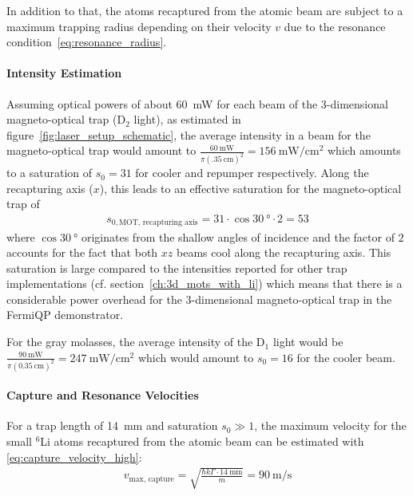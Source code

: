 In addition to that, the atoms recaptured from the atomic beam are subject to a maximum trapping radius depending on their velocity $v$ due to the resonance condition~\eqref{eq:resonance_radius}.

\paragraph{Intensity Estimation}
Assuming optical powers of about \SI{60}{\milli\watt} for each beam of the 3-dimensional magneto-optical trap (D$_2$ light), as estimated in figure~\ref{fig:laser_setup_schematic}, the average intensity in a beam for the magneto-optical trap would amount to $\frac{\SI{60}{\milli\watt}}{\pi (\SI{.35}{\centi\meter})^2} = \SI{156}{\milli\watt\per\centi\meter\squared}$ which amounts to a saturation of $s_0 = 31$ for cooler and repumper respectively. Along the recapturing axis ($x$), this leads to an effective saturation for the magneto-optical trap of
\begin{align}
    s_{0, \text{MOT, recapturing axis}} = 31 \cdot \cos \SI{30}{\degree} \cdot 2 = 53
\end{align}
where $\cos \SI{30}{\degree}$ originates from the shallow angles of incidence and the factor of $2$ accounts for the fact that both $xz$ beams cool along the recapturing axis. This saturation is large compared to the intensities reported for other trap implementations (cf. section~\ref{ch:3d_mots_with_li}) which means that there is a considerable power overhead for the 3-dimensional magneto-optical trap in the FermiQP demonstrator.

For the gray molasses, the average intensity of the D$_1$ light would be $\frac{\SI{90}{\milli\watt}}{\pi (\SI{0.35}{\centi\meter})^2} = \SI{247}{\milli\watt\per\centi\meter\squared}$ which would amount to $s_0 = 16$ for the cooler beam.

\paragraph{Capture and Resonance Velocities}
For a trap length of \SI[]{14}{\milli\meter} and saturation $s_0 \gg 1$, the maximum velocity for the small $^6$Li atoms recaptured from the atomic beam can be estimated with \eqref{eq:capture_velocity_high}:
\begin{align}
    v_\text{max, capture} = \sqrt{\frac{\hbar k \Gamma \cdot \SI[]{14}{\milli\meter}}{m}} = \SI[]{90}{\meter\per\second}
\end{align}

